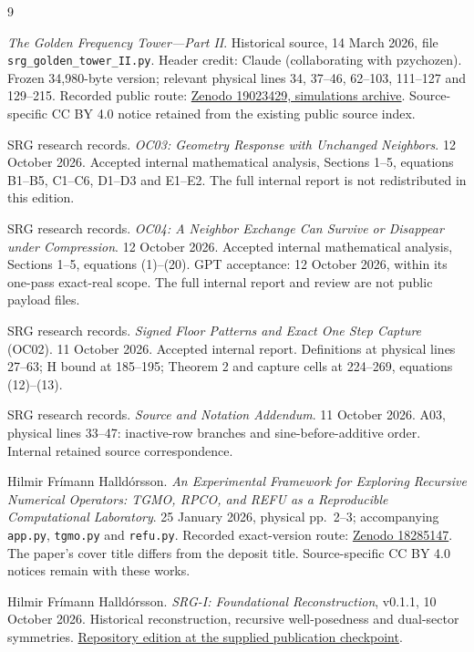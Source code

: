 \documentclass[11pt,a4paper]{article}
\theoremstyle{remark}\newtheorem{remark}[theorem]{Remark}
\numberwithin{equation}{section}
\begin{document}
\begin{thebibliography}{9}
\raggedright

\emph{The Golden Frequency Tower---Part II}.
Historical source, 14 March 2026, file
\texttt{srg\_golden\_tower\_II.py}.
Header credit: Claude (collaborating with pzychozen).
Frozen 34,980-byte version; relevant physical lines 34, 37--46,
62--103, 111--127 and 129--215.
Recorded public route:
\href{https://zenodo.org/records/19023429/files/simulations.zip}{Zenodo 19023429, simulations archive}.
Source-specific CC BY 4.0 notice retained from the existing public source index.

SRG research records.
\emph{OC03: Geometry Response with Unchanged Neighbors}.
12 October 2026. Accepted internal mathematical analysis,
Sections 1--5, equations B1--B5, C1--C6, D1--D3 and E1--E2.
The full internal report is not redistributed in this edition.

SRG research records.
\emph{OC04: A Neighbor Exchange Can Survive or Disappear under Compression}.
12 October 2026. Accepted internal mathematical analysis,
Sections 1--5, equations (1)--(20).
GPT acceptance: 12 October 2026, within its one-pass exact-real scope.
The full internal report and review are not public payload files.

SRG research records.
\emph{Signed Floor Patterns and Exact One Step Capture} (OC02).
11 October 2026. Accepted internal report.
Definitions at physical lines 27--63; H bound at 185--195;
Theorem 2 and capture cells at 224--269, equations (12)--(13).

SRG research records.
\emph{Source and Notation Addendum}.
11 October 2026. A03, physical lines 33--47:
inactive-row branches and sine-before-additive order.
Internal retained source correspondence.

Hilmir Fr\'imann Halld\'orsson.
\emph{An Experimental Framework for Exploring Recursive Numerical Operators:
TGMO, RPCO, and REFU as a Reproducible Computational Laboratory}.
25 January 2026, physical pp.\ 2--3; accompanying
\texttt{app.py}, \texttt{tgmo.py} and \texttt{refu.py}.
Recorded exact-version route:
\href{https://zenodo.org/records/18285147}{Zenodo 18285147}.
The paper's cover title differs from the deposit title.
Source-specific CC BY 4.0 notices remain with these works.

Hilmir Fr\'imann Halld\'orsson.
\emph{SRG-I: Foundational Reconstruction}, v0.1.1, 10 October 2026.
Historical reconstruction, recursive well-posedness and dual-sector symmetries.
\href{https://github.com/pzychozen/trioctagon-physics/tree/3e5972be2f233b6c8ec3c2ebe0687ee1f8f2ff1f/SRG_REDISCOVERY/PAPERS/SRG_I_FOUNDATIONAL_RECONSTRUCTION/publication/v0.1.1}{Repository edition at the supplied publication checkpoint}.


\end{thebibliography}
\end{document}
